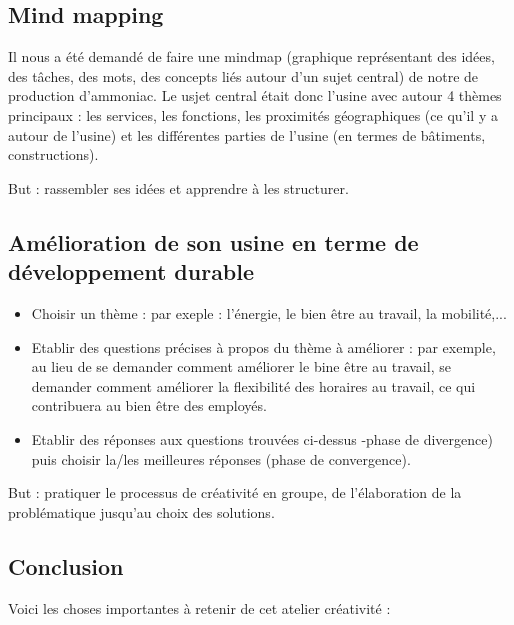\subsection{Mind mapping}
Il nous a été demandé de faire une mindmap (graphique représentant des idées, des tâches, des mots,
des concepts liés autour d'un sujet central) de notre de production d'ammoniac.
Le usjet central était donc l'usine avec autour 4 thèmes principaux : les services, les fonctions,
les proximités géographiques (ce qu'il y a autour de l'usine) et les différentes parties de l'usine
(en termes de bâtiments, constructions).

But : rassembler ses idées et apprendre à les structurer.

\subsection{Amélioration de son usine en terme de développement durable}

\begin{itemize}
	\item Choisir un thème : par exeple : l'énergie, le bien être au travail, la mobilité,...
	\item Etablir des questions précises à propos du thème à améliorer : par exemple, au lieu de se
	demander comment améliorer le bine être au travail, se demander comment améliorer la flexibilité
	des horaires au travail, ce qui contribuera au bien être des employés.
	\item Etablir des réponses aux questions trouvées ci-dessus -phase de divergence) puis choisir
	la/les meilleures réponses (phase de convergence).
\end{itemize}

But : pratiquer le processus de créativité en groupe, de l'élaboration de la problématique jusqu'au choix des solutions.

\subsection{Conclusion}
Voici les choses importantes à retenir de cet atelier créativité :

